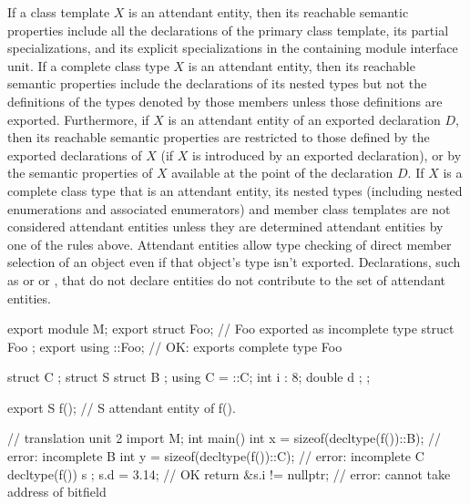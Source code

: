 \begin{std.txt}
  If a class template $X$ is an attendant entity, then its reachable semantic
  properties include all the declarations of the primary class template,
  its partial specializations, and its explicit specializations in the
  containing module interface unit.
  If a complete class type $X$ is an attendant entity, then its reachable
  semantic properties include the declarations of its nested types but
  not the definitions of the types denoted by those members
   unless those definitions are exported.
  Furthermore, if $X$ is an attendant entity of an 
  exported declaration $D$, then its reachable semantic properties are 
  restricted to those defined by the exported declarations of $X$ 
  (if $X$ is introduced by an exported declaration), or by 
  the semantic properties of $X$ available at the point of the declaration $D$.
  \enternote
  If $X$ is a complete class type that is an attendant entity, its nested types
  (including nested enumerations and associated enumerators) 
  and member class templates
  are not considered attendant entities unless they are determined attendant
  entities by one of the rules above.  Attendant entities allow type checking 
  of direct member selection of an object even if that object's type isn't exported.
  Declarations, such as  or
   or 
  ,
   that do not declare entities do not contribute to the set of attendant entities.
  \exitnote
  \begin{example}
    \begin{codeblock}
      export module M;
      export struct Foo;          // Foo exported as incomplete type
      struct Foo { };
      export using ::Foo;         // OK: exports complete type Foo

      struct C { };
      struct S {
        struct B { };
        using C = ::C;
        int i : 8;
        double d { };
      };

      export S f();       // S attendant entity of f().

      // translation unit 2
      import M;
      int main() {
        int x = sizeof(decltype(f())::B);   // error: incomplete B
        int y = sizeof(decltype(f())::C);   // error: incomplete C
        decltype(f()) s { };
        s.d = 3.14;                         // OK
        return &s.i != nullptr;             // error: cannot take address of bitfield
      }
    \end{codeblock}
  \end{example}


\end{std.txt}

